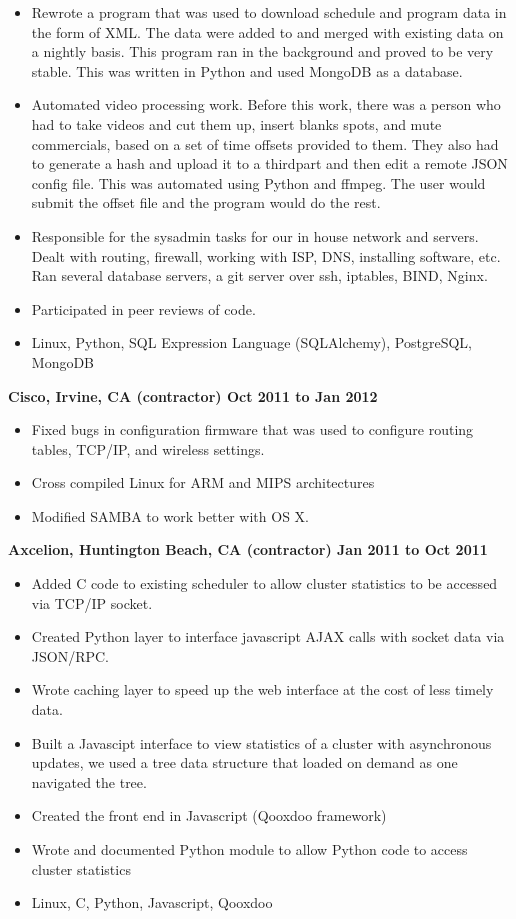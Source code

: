 \documentclass{res}
\begin{document}
\begin{resume}
\begin{itemize}
\item Rewrote a program that was used to download schedule and program
data in the form of XML.  The data were added to and merged with existing
data on a nightly basis.  This program ran in the background and
proved to be very stable.  This was written in Python and used
MongoDB as a database.

\item Automated video processing work.  Before this work, there
was a person who had to take videos and cut them up, insert blanks spots,
and mute commercials, based on a set of time offsets provided to them.  They
also had to generate a hash and upload it to a thirdpart and then edit
a remote JSON config file.  This was automated using Python and ffmpeg.
The user would submit the offset file and the program would do the rest.

\item Responsible for the sysadmin tasks for our in house
network and servers.  Dealt with routing, firewall, working with ISP,
DNS, installing software, etc.  Ran several database servers, a git
server over ssh, iptables, BIND, Nginx.  

\item Participated in peer reviews of code.

\item Linux, Python, SQL Expression Language (SQLAlchemy), PostgreSQL, MongoDB
\end{itemize}

{\large \bf Cisco, Irvine, CA (contractor) \hfill Oct 2011 to Jan 2012}
\begin{itemize}
\item Fixed bugs in configuration firmware that was used to configure
 routing tables, TCP/IP, and wireless settings.
\item Cross compiled Linux for ARM and MIPS architectures
\item Modified SAMBA to work better with OS X.
\end{itemize}

{\large \bf Axcelion, Huntington Beach, CA (contractor) \hfill Jan 2011 to Oct 2011}
\begin{itemize}
\item Added  C code to existing scheduler to allow cluster statistics to
be accessed via TCP/IP socket.
\item Created Python layer to interface javascript AJAX calls with
socket data via JSON/RPC.
\item Wrote caching layer to speed up the web interface at the cost of
less timely data.
\item Built a Javascipt interface to view statistics of a cluster with
asynchronous updates, we used a tree data structure that loaded on
demand as one navigated the tree.
\item Created the front end in Javascript (Qooxdoo framework)
\item Wrote and documented Python module to allow Python code to
access cluster statistics
\item Linux, C, Python, Javascript, Qooxdoo
\end{itemize}


\end{resume}
\end{document}
